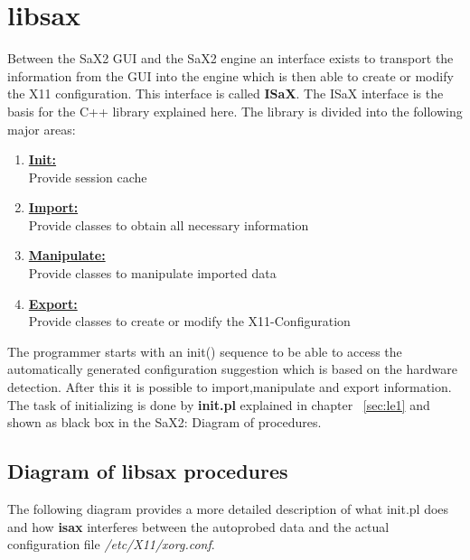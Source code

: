 \chapter{libsax}
\label{cha:libsax}
\minitoc

Between the SaX2 GUI and the SaX2 engine an interface exists to
transport the information from the GUI into the engine which
is then able to create or modify the X11 configuration. This
interface is called \textbf{ISaX}. The ISaX interface is the basis for
the C++ library explained here. The library is divided into the
following major areas:

\begin{enumerate}
\item \textbf{\underline{Init:}}\\
      Provide session cache
\item \textbf{\underline{Import:}}\\
      Provide classes to obtain all necessary information
\item \textbf{\underline{Manipulate:}}\\
      Provide classes to manipulate imported data
\item \textbf{\underline{Export:}}\\
      Provide classes to create or modify the X11-Configuration
\end{enumerate}

The programmer starts with an init() sequence to be able to
access the automatically generated configuration suggestion which is
based on the hardware detection. After this it is possible to
import,manipulate and export information. The task of initializing
is done by \textbf{init.pl} explained in chapter ~\ref{sec:le1} and
shown as black box in the SaX2: Diagram of procedures.

\section{Diagram of libsax procedures}
The following diagram provides a more detailed description of
what init.pl does and how \textbf{isax} interferes between the
autoprobed data and the actual configuration file
\textit{/etc/X11/xorg.conf}.

\newpage

